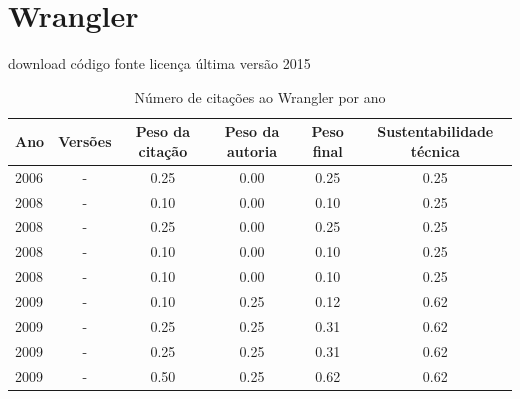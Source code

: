\section{Wrangler}
\checkmark download
\checkmark código fonte
\checkmark licença
\checkmark última versão 2015


\begin{table}[H]
\caption{Número de citações ao Wrangler por ano}
\centering
\begin{tabular}{| l | c | c | c | c | c |}
  \hline
  Ano & Versões & Peso da citação & Peso da autoria & Peso final & Sustentabilidade técnica \\
  \hline
            2006
          &
          -
          &
          0.25
          &
          0.00
          &
          0.25
          &
            {\color{red} 0.25}
          \\
\hline
            2008
          &
          -
          &
          0.10
          &
          0.00
          &
          0.10
          &
            {\color{red} 0.25}
          \\
            2008
          &
          -
          &
          0.25
          &
          0.00
          &
          0.25
          &
            {\color{red} 0.25}
          \\
            2008
          &
          -
          &
          0.10
          &
          0.00
          &
          0.10
          &
            {\color{red} 0.25}
          \\
            2008
          &
          -
          &
          0.10
          &
          0.00
          &
          0.10
          &
            {\color{red} 0.25}
          \\
\hline
            2009
          &
          -
          &
          0.10
          &
          0.25
          &
          0.12
          &
            {\color{blue} 0.62}
          \\
            2009
          &
          -
          &
          0.25
          &
          0.25
          &
          0.31
          &
            {\color{blue} 0.62}
          \\
            2009
          &
          -
          &
          0.25
          &
          0.25
          &
          0.31
          &
            {\color{blue} 0.62}
          \\
            2009
          &
          -
          &
          0.50
          &
          0.25
          &
          0.62
          &
            {\color{blue} 0.62}
          \\

\end{tabular}
\end{table}
